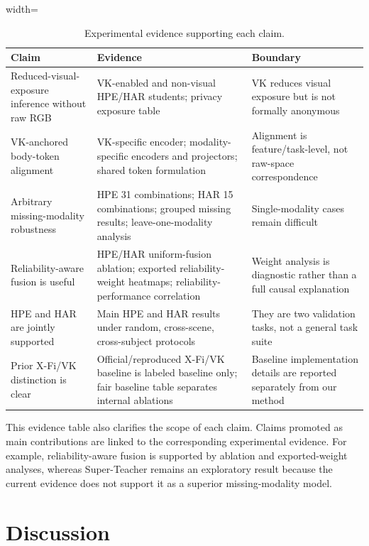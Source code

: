 \documentclass[preprint,12pt]{elsarticle}
\begin{document}
\begin{table}[t]
\centering
\caption{Experimental evidence supporting each claim.}
\label{tab:evidence}
\begin{adjustbox}{width=\textwidth}
\begin{tabular}{p{}p{}p{}}
\toprule
Claim & Evidence & Boundary \\
\midrule
Reduced-visual-exposure inference without raw RGB & VK-enabled and non-visual HPE/HAR students; privacy exposure table & VK reduces visual exposure but is not formally anonymous \\
VK-anchored body-token alignment & VK-specific encoder; modality-specific encoders and projectors; shared token formulation & Alignment is feature/task-level, not raw-space correspondence \\
Arbitrary missing-modality robustness & HPE 31 combinations; HAR 15 combinations; grouped missing results; leave-one-modality analysis & Single-modality cases remain difficult \\
Reliability-aware fusion is useful & HPE/HAR uniform-fusion ablation; exported reliability-weight heatmaps; reliability-performance correlation & Weight analysis is diagnostic rather than a full causal explanation \\
HPE and HAR are jointly supported & Main HPE and HAR results under random, cross-scene, cross-subject protocols & They are two validation tasks, not a general task suite \\
Prior X-Fi/VK distinction is clear & Official/reproduced X-Fi/VK baseline is labeled baseline only; fair baseline table separates internal ablations & Baseline implementation details are reported separately from our method \\
\bottomrule
\end{tabular}
\end{adjustbox}
\end{table}

This evidence table also clarifies the scope of each claim. Claims promoted as main contributions are linked to the corresponding experimental evidence. For example, reliability-aware fusion is supported by ablation and exported-weight analyses, whereas Super-Teacher remains an exploratory result because the current evidence does not support it as a superior missing-modality model.

\section{Discussion}
\end{document}
